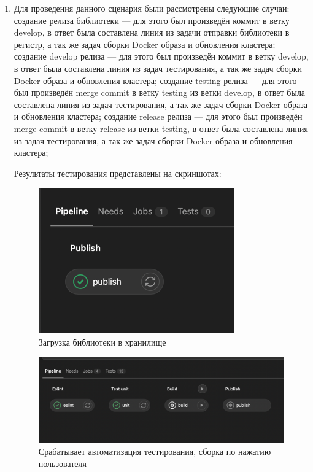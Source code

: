 \begin{enumerate}
    \item Для проведения данного сценария были рассмотрены следующие случаи:
    создание релиза библиотеки --- для этого был произведён коммит в ветку develop, в ответ была составлена линия из задачи отправки библиотеки в регистр,
    а так же задач сборки Docker образа и обновления кластера;
    создание develop релиза --- для этого был произведён коммит в ветку develop, в ответ была составлена линия из задач тестирования,
    а так же задач сборки Docker образа и обновления кластера;
    создание testing релиза --- для этого был произведён merge commit в ветку testing из ветки develop, в ответ была составлена линия из задач тестирования,
    а так же задач сборки Docker образа и обновления кластера;
    создание release релиза --- для этого был произведён merge commit в ветку release из ветки testing, в ответ была составлена линия из задач тестирования,
    а так же задач сборки Docker образа и обновления кластера;

    Результаты тестирования представлены на скриншотах:

    \begin{figure}[ht]
        \centering
        \includegraphics[scale=0.8]{src/figures/qa-library}
        \caption{Загрузка библиотеки в хранилище}
        \label{fig:qa-library}
    \end{figure}

    \begin{figure}[ht]
        \centering
        \includegraphics[scale=0.6]{src/figures/qa-pipeline-trigger}
        \caption{Срабатывает автоматизация тестирования, сборка по нажатию пользователя}
        \label{fig:qa-pipeline-trigger}
    \end{figure}


\end{enumerate}
